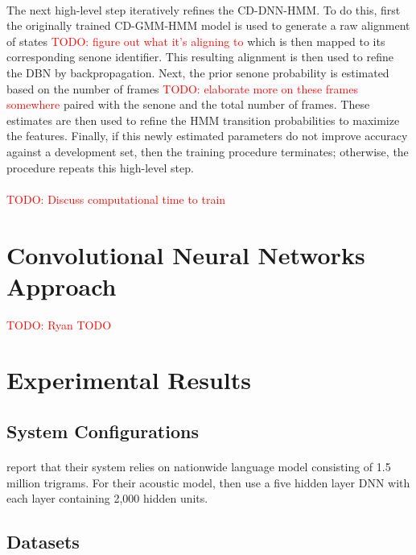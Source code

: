 \documentclass[letterpaper]{article}
\newcommand{\TODO}[1]{\textcolor{red}{TODO: #1}}
\begin{document}
\paragraph{} The next high-level step iteratively refines the CD-DNN-HMM. To do this, first the originally trained CD-GMM-HMM model is used to generate a raw alignment of states \TODO{figure out what it's aligning to} which is then mapped to its corresponding senone identifier. This resulting alignment is then used to refine the DBN by backpropagation. Next, the prior senone probability is estimated based on the number of frames \TODO{elaborate more on these frames somewhere} paired with the senone and the total number of frames. These estimates are then used to refine the HMM transition probabilities to maximize the features. Finally, if this newly estimated parameters do not improve accuracy against a development set, then the training procedure terminates; otherwise, the procedure repeats this high-level step.

\paragraph{} \TODO{Discuss computational time to train}

\section*{Convolutional Neural Networks Approach} \TODO{Ryan TODO}

\section*{Experimental Results} 

\subsection*{System Configurations}

\paragraph{} \cite{DBLP:journals/taslp/DahlYDA12} report that their system relies on nationwide language model consisting of 1.5 million trigrams. For their acoustic model, then use a five hidden layer DNN with each layer containing 2,000 hidden units. 

\subsection*{Datasets}
\end{document}
